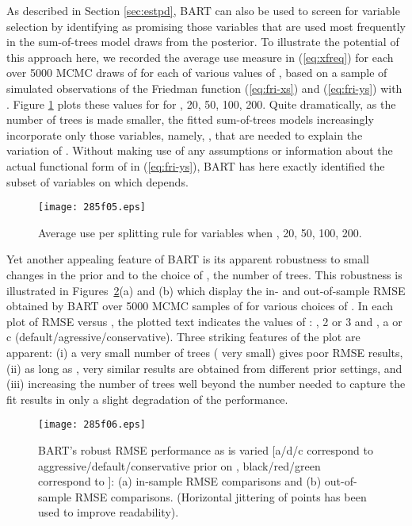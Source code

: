 \documentclass[aoas,nameyear,dvips]{arximspdf}
\begin{document}
As described in Section \ref{sec:estpd}, BART can also be used to
screen for variable selection by identifying as promising those
variables that are used most frequently in the sum-of-trees model 
draws from the posterior.   To illustrate the potential of this
approach here, we recorded the average use measure  in
(\ref{eq:xfreq}) for each  over 5000 MCMC draws of  for each
of various values of , based on a sample of  simulated
observations of the Friedman function (\ref{eq:fri-xs}) and
(\ref{eq:fri-ys}) with .  Figure \ref{fig:friedman-varsel}
plots these  values for  for , 20, 50, 100, 200.  Quite dramatically, as the number of trees  is
made smaller, the fitted sum-of-trees models increasingly incorporate
only those  variables, namely, , that are needed to
explain the variation of .  Without making use of any assumptions or
information about the actual functional form of  in
(\ref{eq:fri-ys}), BART has here exactly identified the subset of
variables on which  depends.

\begin{figure}

\texttt{[image: 285f05.eps]}

\caption{Average use per splitting rule for variables  when , 20, 50, 100, 200.} \label{fig:friedman-varsel}
\end{figure}


Yet another appealing feature of BART is its apparent
robustness to small changes in the prior and to the
choice of , the number of trees.   This robustness is illustrated in
Figures~\ref{fig:friedmanmrun1}(a) and (b) which display the in-
and out-of-sample RMSE  obtained by BART over 5000 MCMC samples of  for various choices of . In each plot of RMSE versus , the plotted text
indicates the values of : , 2 or 3 and , a or c (default/agressive/conservative). Three striking
features of the plot are apparent: (i) a very small number of
trees ( very small) gives poor RMSE results, (ii) as long as ,
very similar results are obtained from different prior settings,
and (iii) increasing the number of trees well beyond the number
needed to capture the fit results in only a slight degradation of
the performance.

\begin{figure}

\texttt{[image: 285f06.eps]}

 \caption{BART's robust RMSE performance as  is varied
[a/d/c correspond to aggressive/default/conservative prior on ,
black/red/green correspond to ]: \textup{(a)} in-sample RMSE
comparisons and \textup{(b)} out-of-sample RMSE comparisons. (Horizontal
jittering of points has been used to improve readability).}\label{fig:friedmanmrun1}
\end{figure}
\end{document}
